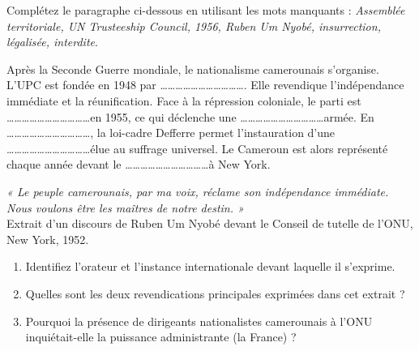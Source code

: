 \documentclass[11pt]{article}
\begin{document}
\begin{exercice}
Complétez le paragraphe ci-dessous en utilisant les mots manquants : \textit{Assemblée territoriale, UN Trusteeship Council, 1956, Ruben Um Nyobé, insurrection, légalisée, interdite}.

Après la Seconde Guerre mondiale, le nationalisme camerounais s'organise. L'UPC est fondée en 1948 par \ldots\ldots\ldots\ldots\ldots\ldots\ldots\ldots\ldots\ldots\ldots. Elle revendique l'indépendance immédiate et la réunification. Face à la répression coloniale, le parti est \ldots\ldots\ldots\ldots\ldots\ldots\ldots\ldots\ldots\ldots\ldots en 1955, ce qui déclenche une \ldots\ldots\ldots\ldots\ldots\ldots\ldots\ldots\ldots\ldots\ldots armée. En \ldots\ldots\ldots\ldots\ldots\ldots\ldots\ldots\ldots\ldots\ldots, la loi-cadre Defferre permet l'instauration d'une \ldots\ldots\ldots\ldots\ldots\ldots\ldots\ldots\ldots\ldots\ldots élue au suffrage universel. Le Cameroun est alors représenté chaque année devant le \ldots\ldots\ldots\ldots\ldots\ldots\ldots\ldots\ldots\ldots\ldots à New York.
\end{exercice}

\begin{exercice}
\textit{« Le peuple camerounais, par ma voix, réclame son indépendance immédiate. Nous voulons être les maîtres de notre destin. »} \\
Extrait d'un discours de Ruben Um Nyobé devant le Conseil de tutelle de l'ONU, New York, 1952.

\begin{enumerate}
    \item Identifiez l'orateur et l'instance internationale devant laquelle il s'exprime.
    \item Quelles sont les deux revendications principales exprimées dans cet extrait ?
    \item Pourquoi la présence de dirigeants nationalistes camerounais à l'ONU inquiétait-elle la puissance administrante (la France) ?
\end{enumerate}
\end{exercice}
\end{document}
